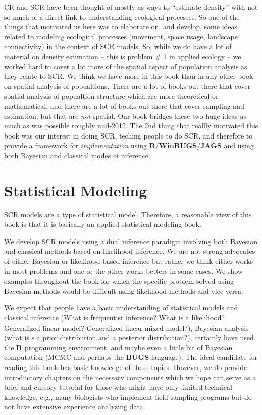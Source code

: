 CR and SCR have been thought of mostly as ways to ``estimate density''
with not so much of a direct link to understanding ecological
processes. So one of the things that motivated us here was to
elaborate on, and develop, some ideas related to modeling ecological
processes (movement, space usage, landscape connectivity) in the
context of SCR models.  So, while we do have a lot of material on
density estimation -- this is problem \# 1 in applied ecology -- we
worked hard to cover a lot more of the spatial aspect of population
analysis as they relate to SCR. We think we have more in this book
than in any other book on spatial analysis of popualtions. There are a
lot of books out there that cover spatial analysis of popualtion
structure which are more theoretical or mathematical, and there are a
lot of books out there that cover sampling and estimation, but that
are {\it not} spatial. Our book bridges these two huge ideas as much
as was possible roughly mid-2012.  The 2nd thing that reallly
motivated this book was our interest in doing SCR, teching people to
do SCR, and therefore to provide a framework for {\it implementation}
using \textbf{R}/\textbf{WinBUGS}/\textbf{JAGS} and using both Bayesian and classical modes of
inference.


\section*{Statistical Modeling}

SCR models are a type of statistical model. Therefore, a reasonable
view of this book is that it is basically an applied statistical
modeling book.

We develop SCR models using a dual inference paradigm involving both
Bayesian and classical methods based on likelihood inference.  We are
not strong advocates of either Bayesian or likelihood-based inference
but rather we think either works in most problems and one or the other
works betters in some cases.  We show examples throughout the book for
which the specific problem solved using Bayesian methods would be
difficult using likelihood methods and vice versa.

We expect that people have a basic understanding of statistical models
and classical inference (What is frequentist inference? What is a
likelihood? Generalized linear model? Generalized linear mixed
model?), Bayesian analysis (what is s a prior distribution and a
posterior distribution?), certainly have used the {\bf R} programming
environment, and maybe even a little bit of Bayesian computation (MCMC
and perhaps the \textbf{BUGS} language).  The ideal candidate for reading this
book has basic knowledge of these topics. However, we do provide
introductory chapters on the necessary components which we hope can
serve as a brief and cursory tutorial for those who might have only
limited technical knowledge, e.g., many biologists who implement field
sampling programs but do not have extensive experience analyzing data.


